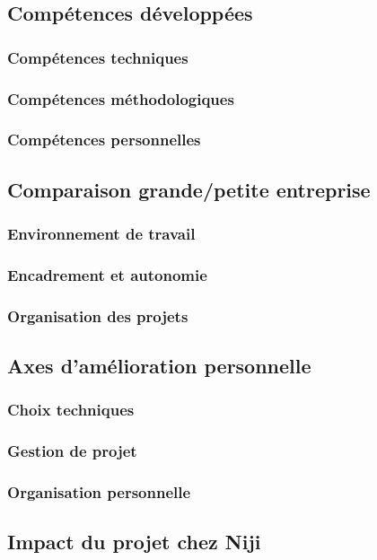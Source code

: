 \documentclass[12pt]{article}
\begin{document}
\subsection{Compétences développées}
\subsubsection{Compétences techniques}
\subsubsection{Compétences méthodologiques}
\subsubsection{Compétences personnelles}

\subsection{Comparaison grande/petite entreprise}
\subsubsection{Environnement de travail}
\subsubsection{Encadrement et autonomie}
\subsubsection{Organisation des projets}

\subsection{Axes d’amélioration personnelle}
\subsubsection{Choix techniques}
\subsubsection{Gestion de projet}
\subsubsection{Organisation personnelle}

\subsection{Impact du projet chez Niji}
\end{document}
